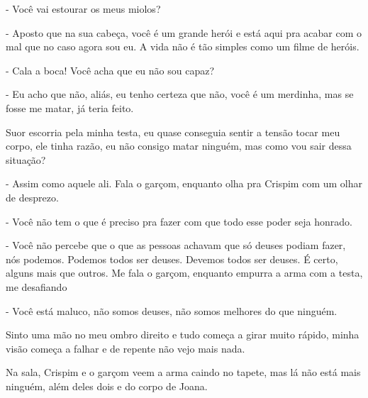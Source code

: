 - Você vai estourar os meus miolos?

- Aposto que na sua cabeça, você é um grande herói e está aqui pra acabar com o mal que no caso agora sou eu. A vida não é tão simples como um filme de heróis.

- Cala a boca! Você acha que eu não sou capaz?

- Eu acho que não, aliás, eu tenho certeza que não, você é um merdinha, mas se fosse me matar, já teria feito. 

Suor escorria pela minha testa, eu quase conseguia sentir a tensão tocar meu corpo, ele tinha razão, eu não consigo matar ninguém, mas como vou sair dessa situação?

- Assim como aquele ali. Fala o garçom, enquanto olha pra Crispim com um olhar de desprezo.

- Você não tem o que é preciso pra fazer com que todo esse poder seja honrado.

- Você não percebe que o que as pessoas achavam que só deuses podiam fazer, nós podemos. Podemos todos ser deuses. Devemos todos ser deuses. É certo, alguns mais que outros. Me fala o garçom, enquanto empurra a arma com a testa, me desafiando

- Você está maluco, não somos deuses, não somos melhores do que ninguém.

Sinto uma mão no meu ombro direito e tudo começa a girar muito rápido, minha visão começa a falhar e de repente não vejo mais nada.

Na sala, Crispim e o garçom veem a arma caindo no tapete, mas lá não está mais ninguém, além deles dois e do corpo de Joana.  